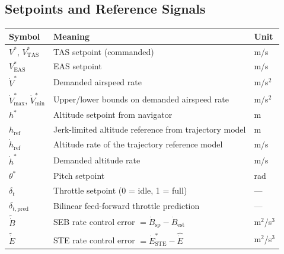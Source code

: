 \documentclass[12pt,a4paper]{article}
\begin{document}
\subsection*{Setpoints and Reference Signals}
\begin{center}\begin{tabular}{lll}\toprule
Symbol & Meaning & Unit \\\midrule
$V^*$, $V^*_{\text{TAS}}$ & TAS setpoint (commanded) & m/s \\
$V^*_{\text{EAS}}$ & EAS setpoint & m/s \\
$\dot{V}^*$ & Demanded airspeed rate & m/s$^2$ \\
$\dot{V}^*_{\max}$, $\dot{V}^*_{\min}$ & Upper/lower bounds on demanded airspeed rate & m/s$^2$ \\
$h^*$ & Altitude setpoint from navigator & m \\
$h_{\text{ref}}$ & Jerk-limited altitude reference from trajectory model & m \\
$\dot{h}_{\text{ref}}$ & Altitude rate of the trajectory reference model & m/s \\
$\dot{h}^*$ & Demanded altitude rate & m/s \\
$\theta^*$ & Pitch setpoint & rad \\
$\delta_t$ & Throttle setpoint (0 = idle, 1 = full) & --- \\
$\delta_{t,\text{pred}}$ & Bilinear feed-forward throttle prediction & --- \\
$\tilde{\dot{B}}$ & SEB rate control error $= \dot{B}_{\text{sp}} - \dot{B}_{\text{est}}$ & m$^2$/s$^3$ \\
$\tilde{\dot{E}}$ & STE rate control error $= \dot{E}^*_{\text{STE}} - \hat{\dot{E}}$ & m$^2$/s$^3$ \\
\bottomrule\end{tabular}\end{center}
\end{document}
